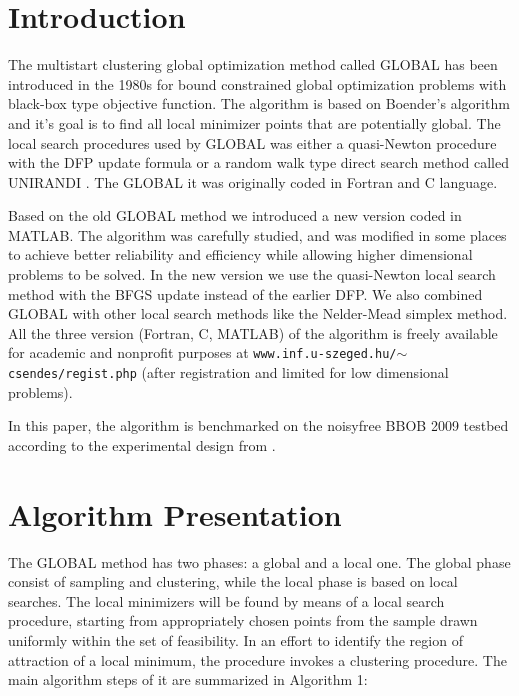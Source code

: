 \documentclass{sig-alternate}
\begin{document}

\section{Introduction}

The multistart clustering global optimization method called GLOBAL \cite{csendes1988}
has been introduced in the 1980s for bound constrained global optimization problems
with black-box type objective function. The algorithm is based on Boender's algorithm \cite{boender1982} and it's goal is to find all local minimizer points that are potentially global. The local search procedures used by GLOBAL was either a quasi-Newton procedure with the DFP update formula or a random walk type direct search
method called UNIRANDI \cite{jarvi1973}. The GLOBAL it was originally coded in Fortran and C language.

Based on the old GLOBAL method we introduced a new version \cite{csendes2008} coded in MATLAB.
The algorithm was carefully studied, and was modified in some places to
achieve better reliability and efficiency while allowing higher dimensional problems
to be solved. In the new version we use the quasi-Newton local search method with
the BFGS update instead of the earlier DFP. We also combined GLOBAL with other local search methods like the Nelder-Mead simplex method. All the three version (Fortran, C, MATLAB) of the algorithm is freely available  for academic and nonprofit purposes at {\tt www.inf.u-szeged.hu/$\sim$csendes/regist.php} (after registration and limited for
low dimensional problems).

In this paper, the algorithm is benchmarked on the noisyfree BBOB 2009
testbed  \cite{wp200901, hansen2009fun} according to the experimental design from \cite{hansen2009exp}.

\section{Algorithm Presentation}

The GLOBAL method has two phases: a global and a local one. The global phase consist of sampling and clustering, while the local phase is based on local searches. The local minimizers
will be found by means of a local search procedure, starting from appropriately
chosen points from the sample drawn uniformly within the set of feasibility. In
an effort to identify the region of attraction of a local minimum, the procedure
invokes a clustering procedure. The main algorithm steps of it are summarized in
Algorithm 1:
\end{document}

